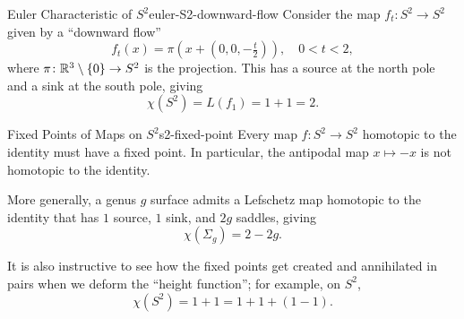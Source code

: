\begin{example}{Euler Characteristic of $S^2$}{euler-S2-downward-flow}
    Consider the map $f_t \colon S^2 \to S^2$ given by a ``downward flow''
    \[
        f_t(x) = \pi\!\left(x + \left(0, 0, -\tfrac{t}{2}\right)\right), \quad 0 < t < 2,
    \]
    where $\pi \colon \mathbb{R}^3 \setminus \{0\} \to S^2$ is the projection. This has a source at the north pole and a sink at the south pole, giving
    \[
        \chi(S^2) = L(f_1) = 1 + 1 = 2.
    \]
\end{example}

\begin{center}
\end{center}

\begin{corollary}{Fixed Points of Maps on $S^2$}{s2-fixed-point}
    Every map $f \colon S^2 \to S^2$ homotopic to the identity must have a fixed point. In particular, the antipodal map $x \mapsto -x$ is not homotopic to the identity.
\end{corollary}

More generally, a genus $g$ surface admits a Lefschetz map homotopic to the identity that has $1$ source, $1$ sink, and $2g$ saddles, giving
\[
    \chi(\Sigma_g) = 2 - 2g.
\]

It is also instructive to see how the fixed points get created and annihilated in pairs when we deform the ``height function''; for example, on $S^2$,
\[
    \chi(S^2) = 1 + 1 = 1 + 1 + (1 - 1).
\]
